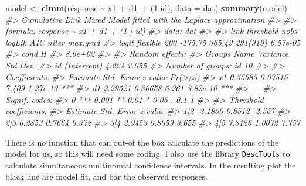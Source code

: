 \documentclass[
]{book}
\newenvironment{Shaded}{\begin{snugshade}}{\end{snugshade}}
\newcommand{\AttributeTok}[1]{\textcolor[rgb]{0.13,0.29,0.53}{#1}}
\newcommand{\CommentTok}[1]{\textcolor[rgb]{0.56,0.35,0.01}{\textit{#1}}}
\newcommand{\DecValTok}[1]{\textcolor[rgb]{0.00,0.00,0.81}{#1}}
\newcommand{\FunctionTok}[1]{\textcolor[rgb]{0.13,0.29,0.53}{\textbf{#1}}}
\newcommand{\NormalTok}[1]{#1}
\newcommand{\OtherTok}[1]{\textcolor[rgb]{0.56,0.35,0.01}{#1}}
\newcommand{\SpecialCharTok}[1]{\textcolor[rgb]{0.81,0.36,0.00}{\textbf{#1}}}
\begin{document}
\begin{Shaded}
\begin{Highlighting}[]
\NormalTok{model }\OtherTok{\textless{}{-}} \FunctionTok{clmm}\NormalTok{(response }\SpecialCharTok{\textasciitilde{}}\NormalTok{ x1 }\SpecialCharTok{+}\NormalTok{ d1 }\SpecialCharTok{+}\NormalTok{ (}\DecValTok{1}\SpecialCharTok{|}\NormalTok{id), }\AttributeTok{data =}\NormalTok{ dat)}
\FunctionTok{summary}\NormalTok{(model)}
\CommentTok{\#\textgreater{} Cumulative Link Mixed Model fitted with the Laplace approximation}
\CommentTok{\#\textgreater{} }
\CommentTok{\#\textgreater{} formula: response \textasciitilde{} x1 + d1 + (1 | id)}
\CommentTok{\#\textgreater{} data:    dat}
\CommentTok{\#\textgreater{} }
\CommentTok{\#\textgreater{}  link  threshold nobs logLik  AIC    niter    max.grad}
\CommentTok{\#\textgreater{}  logit flexible  200  {-}175.75 365.49 291(919) 6.57e{-}05}
\CommentTok{\#\textgreater{}  cond.H }
\CommentTok{\#\textgreater{}  8.6e+02}
\CommentTok{\#\textgreater{} }
\CommentTok{\#\textgreater{} Random effects:}
\CommentTok{\#\textgreater{}  Groups Name        Variance Std.Dev.}
\CommentTok{\#\textgreater{}  id     (Intercept) 4.224    2.055   }
\CommentTok{\#\textgreater{} Number of groups:  id 10 }
\CommentTok{\#\textgreater{} }
\CommentTok{\#\textgreater{} Coefficients:}
\CommentTok{\#\textgreater{}    Estimate Std. Error z value Pr(\textgreater{}|z|)    }
\CommentTok{\#\textgreater{} x1  0.55685    0.07516   7.409 1.27e{-}13 ***}
\CommentTok{\#\textgreater{} d1  2.29521    0.36658   6.261 3.82e{-}10 ***}
\CommentTok{\#\textgreater{} {-}{-}{-}}
\CommentTok{\#\textgreater{} Signif. codes:  }
\CommentTok{\#\textgreater{} 0 \textquotesingle{}***\textquotesingle{} 0.001 \textquotesingle{}**\textquotesingle{} 0.01 \textquotesingle{}*\textquotesingle{} 0.05 \textquotesingle{}.\textquotesingle{} 0.1 \textquotesingle{} \textquotesingle{} 1}
\CommentTok{\#\textgreater{} }
\CommentTok{\#\textgreater{} Threshold coefficients:}
\CommentTok{\#\textgreater{}     Estimate Std. Error z value}
\CommentTok{\#\textgreater{} 1|2  {-}2.1850     0.8512  {-}2.567}
\CommentTok{\#\textgreater{} 2|3   0.2853     0.7664   0.372}
\CommentTok{\#\textgreater{} 3|4   2.9453     0.8059   3.655}
\CommentTok{\#\textgreater{} 4|5   7.8126     1.0072   7.757}
\end{Highlighting}
\end{Shaded}

There is no function that can out-of the box calculate the predictions of the model for us, so this will need some coding. I also use the library \texttt{DescTools} to calculate simultaneous multinomial confidence intervals. In the resulting plot the black line are model fit, and bar the observed responses.
\end{document}
